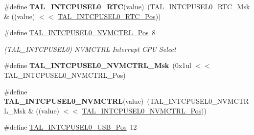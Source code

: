 \begin{DoxyCompactItemize}
\item 
\hypertarget{group___s_a_m_l21___t_a_l_gab37900df9755fcf9a3778f9ba7b20d56}{}\#define {\bfseries T\+A\+L\+\_\+\+I\+N\+T\+C\+P\+U\+S\+E\+L0\+\_\+\+R\+T\+C}(value)~(T\+A\+L\+\_\+\+I\+N\+T\+C\+P\+U\+S\+E\+L0\+\_\+\+R\+T\+C\+\_\+\+Msk \& ((value) $<$$<$ \hyperlink{group___s_a_m_l21___t_a_l_ga5b800db846e6c6f837d8411ecbad64b5}{T\+A\+L\+\_\+\+I\+N\+T\+C\+P\+U\+S\+E\+L0\+\_\+\+R\+T\+C\+\_\+\+Pos}))\label{group___s_a_m_l21___t_a_l_gab37900df9755fcf9a3778f9ba7b20d56}

\item 
\hypertarget{group___s_a_m_l21___t_a_l_gaadc46b3e898e33c2ff8b66c8194f5662}{}\#define \hyperlink{group___s_a_m_l21___t_a_l_gaadc46b3e898e33c2ff8b66c8194f5662}{T\+A\+L\+\_\+\+I\+N\+T\+C\+P\+U\+S\+E\+L0\+\_\+\+N\+V\+M\+C\+T\+R\+L\+\_\+\+Pos}~8\label{group___s_a_m_l21___t_a_l_gaadc46b3e898e33c2ff8b66c8194f5662}

\begin{DoxyCompactList}\small\item\em (T\+A\+L\+\_\+\+I\+N\+T\+C\+P\+U\+S\+E\+L0) N\+V\+M\+C\+T\+R\+L Interrupt C\+P\+U Select \end{DoxyCompactList}\item 
\hypertarget{group___s_a_m_l21___t_a_l_ga9fc5363957bb0b4227e6d4774c95aa4d}{}\#define {\bfseries T\+A\+L\+\_\+\+I\+N\+T\+C\+P\+U\+S\+E\+L0\+\_\+\+N\+V\+M\+C\+T\+R\+L\+\_\+\+Msk}~(0x1ul $<$$<$ T\+A\+L\+\_\+\+I\+N\+T\+C\+P\+U\+S\+E\+L0\+\_\+\+N\+V\+M\+C\+T\+R\+L\+\_\+\+Pos)\label{group___s_a_m_l21___t_a_l_ga9fc5363957bb0b4227e6d4774c95aa4d}

\item 
\hypertarget{group___s_a_m_l21___t_a_l_gad53d5e5032d6998e1a218a1c6cc10bf2}{}\#define {\bfseries T\+A\+L\+\_\+\+I\+N\+T\+C\+P\+U\+S\+E\+L0\+\_\+\+N\+V\+M\+C\+T\+R\+L}(value)~(T\+A\+L\+\_\+\+I\+N\+T\+C\+P\+U\+S\+E\+L0\+\_\+\+N\+V\+M\+C\+T\+R\+L\+\_\+\+Msk \& ((value) $<$$<$ \hyperlink{group___s_a_m_l21___t_a_l_gaadc46b3e898e33c2ff8b66c8194f5662}{T\+A\+L\+\_\+\+I\+N\+T\+C\+P\+U\+S\+E\+L0\+\_\+\+N\+V\+M\+C\+T\+R\+L\+\_\+\+Pos}))\label{group___s_a_m_l21___t_a_l_gad53d5e5032d6998e1a218a1c6cc10bf2}

\item 
\hypertarget{group___s_a_m_l21___t_a_l_gace1b71330fba3864462ab3b7ec5f07cf}{}\#define \hyperlink{group___s_a_m_l21___t_a_l_gace1b71330fba3864462ab3b7ec5f07cf}{T\+A\+L\+\_\+\+I\+N\+T\+C\+P\+U\+S\+E\+L0\+\_\+\+U\+S\+B\+\_\+\+Pos}~12\label{group___s_a_m_l21___t_a_l_gace1b71330fba3864462ab3b7ec5f07cf}


\end{DoxyCompactItemize}
